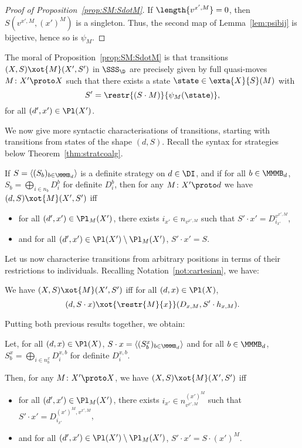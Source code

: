 \documentclass{LMCS}
\renewcommand{\with}[1]{\langle #1 \rangle}
\theoremstyle{plain}\newtheorem{satz}[thm]{Satz}
\begin{document}
\begin{proof}[Proof of Proposition~\ref{prop:SM:SdotM}]
  If $\length{v^{x',M}} = 0$, then $S(v^{x',M}, (x')^M)$ is a
  singleton. Thus, the second map of Lemma~\ref{lem:psibij} is bijective, hence so is $\psi_M$.
\end{proof}

The moral of Proposition~\ref{prop:SM:SdotM} is that transitions
$(X,S) \xot{M} (X',S')$ in $\SSS_\D$ are precisely given by full
quasi-moves $M \colon X' \proto X$ such that there exists a state
$\state \in \exta{X}{S} (M)$ with
$$S' = \restr{(S \cdot M)}{\psi_M(\state)},$$
for all $(d',x') \in \Pl (X')$.

We now give more syntactic characterisations of transitions, starting 
with transitions from states of the shape $(d,S)$.
Recall the syntax for strategies below Theorem~\ref{thm:stratcoalg}.
\begin{prop}
  If $S = \with{(S_b)_{b \in \MMMB_d}}$ is a definite strategy on $d
  \in \DI$, and if for all $b \in \MMMB_d$, $S_b = \bigoplus_{i \in
    n_b} D^b_i$ for definite $D^b_i$, then for any $M \colon X' \proto
  d$ we have $(d,S) \xot{M} (X',S')$ iff
  \begin{itemize}
  \item for all $(d',x') \in \Pl_M (X')$, there exists $i_{x'} \in
    n_{v^{x',M}}$ such that $S' \cdot x' = D^{v^{x',M}}_{i_{x'}}$,
  \item and for
    all $(d',x') \in \Pl (X') \setminus \Pl_M (X')$, $S' \cdot x' = S$.
  \end{itemize}
\end{prop}
Let us now characterise transitions from arbitrary positions in terms
of their restrictions to individuals.  Recalling
Notation~\ref{not:cartesian}, we have:
\begin{prop}\label{prop:localtrans}
  We have $(X,S) \xot{M} (X',S')$ iff for all $(d,x) \in \Pl (X)$, 
  $$(d,S \cdot x) \xot{\restr{M}{x}} (D_{x,M}, S' \cdot h_{x,M}).$$
\end{prop}

Putting both previous results together, we obtain:
\begin{cor}
  Let, for all $(d,x) \in \Pl (X)$,  $S \cdot x = \with{(S^x_b)_{b \in
      \MMMB_d}}$ and for all $b \in \MMMB_d$, $S^x_b = \bigoplus_{i
    \in n^x_b} D^{x,b}_i$ for definite $D^{x,b}_i$.

  Then, for any $M \colon X' \proto X$, we have $(X,S) \xot{M}
  (X',S')$ iff
  \begin{itemize}
  \item for all $(d',x') \in \Pl_M (X')$, there exists $i_{x'} \in
    n^{(x')^M}_{v^{x',M}}$ such that $S' \cdot {x'} = D^{(x')^M, v^{x',M}}_{i_{x'}}$,
  \item and for
    all $(d',x') \in \Pl (X') \setminus \Pl_M (X')$, $S' \cdot {x'} = S \cdot {(x')^M}$.
  \end{itemize}
\end{cor}
\end{document}
